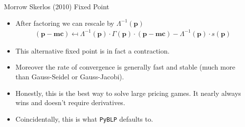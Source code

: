 \begin{frame}{Morrow Skerlos (2010) Fixed Point}
\begin{itemize}
\item After factoring we can rescale by $\Lambda^{-1} (\symbf{p})$
\begin{align*}
(\symbf{p}-\symbf{mc} ) \mapsfrom \Lambda^{-1}(\symbf{p}) \cdot \Gamma(\symbf{p})\cdot(\symbf{p}- \symbf{mc}) - \Lambda^{-1}(\symbf{p})\cdot s(\symbf{p})
\end{align*}
\item This alternative fixed point is in fact a contraction.
\item Moreover the rate of convergence is generally fast and stable (much more than Gauss-Seidel or Gauss-Jacobi).
\item Honestly, this is the best way to solve large pricing games. It nearly always wins and doesn't require derivatives.
\item Coincidentally, this is what \texttt{PyBLP} defaults to.
\end{itemize}
\end{frame}






